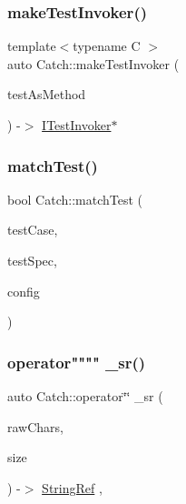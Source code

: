 \mbox{\label{namespace_catch_a82a954c4d70afa716115820dc7dc8d24}} 
\subsubsection{\texorpdfstring{make\+Test\+Invoker()}{makeTestInvoker()}\hspace{0.1cm}{\footnotesize\ttfamily [2/2]}}
{\footnotesize\ttfamily template$<$typename C $>$ \\
auto Catch\+::make\+Test\+Invoker (\begin{DoxyParamCaption}\item[{void(C\+::$\ast$)()}]{test\+As\+Method }\end{DoxyParamCaption}) -\/$>$ \mbox{\hyperlink{struct_catch_1_1_i_test_invoker}{I\+Test\+Invoker}}$\ast$ \hspace{0.3cm}{\ttfamily [noexcept]}}

\mbox{\label{namespace_catch_aadef80fbc6bc84589777a462770cef49}} 
\subsubsection{\texorpdfstring{match\+Test()}{matchTest()}}
{\footnotesize\ttfamily bool Catch\+::match\+Test (\begin{DoxyParamCaption}\item[{\mbox{\hyperlink{class_catch_1_1_test_case}{Test\+Case}} const \&}]{test\+Case,  }\item[{Test\+Spec const \&}]{test\+Spec,  }\item[{I\+Config const \&}]{config }\end{DoxyParamCaption})}

\mbox{\label{namespace_catch_a36bf2a7f244cdce2d6729e53658d2370}} 
\subsubsection{\texorpdfstring{operator"""" \+\_\+sr()}{operator"" \_sr()}}
{\footnotesize\ttfamily auto Catch\+::operator\char`\"{}\char`\"{} \+\_\+sr (\begin{DoxyParamCaption}\item[{char const $\ast$}]{raw\+Chars,  }\item[{std\+::size\+\_\+t}]{size }\end{DoxyParamCaption}) -\/$>$ \mbox{\hyperlink{class_catch_1_1_string_ref}{String\+Ref}} \hspace{0.3cm}{\ttfamily [inline]}, {\ttfamily [noexcept]}}


